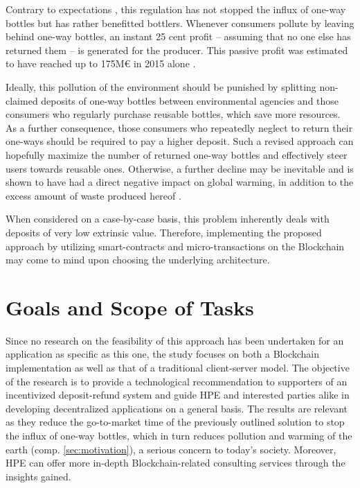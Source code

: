 Contrary to expectations \cite[§ 8]{verpackV}, this regulation has not stopped the influx of one-way bottles but has rather benefitted bottlers. Whenever consumers pollute by leaving behind one-way bottles, an instant 25 cent profit -- assuming that no one else has returned them -- is generated for the producer. This passive profit was estimated to have reached up to 175M\euro{} in 2015 alone \cite{mehrwegSystem}. 


Ideally, this pollution of the environment should be punished by splitting non-claimed deposits of one-way bottles between environmental agencies and those consumers who regularly purchase reusable bottles, which save more resources. As a further consequence, those consumers who repeatedly neglect to return their one-ways should be required to pay a higher deposit. Such a revised approach can hopefully maximize the number of returned one-way bottles and effectively steer users towards reusable ones. Otherwise, a further decline may be inevitable and is shown to have had a direct negative impact on global warming, in addition to the excess amount of waste produced hereof \cite{einwegUmweltbelastung}.

When considered on a case-by-case basis, this problem inherently deals with deposits of very low extrinsic value. Therefore, implementing the proposed approach by utilizing smart-contracts and micro-transactions on the Blockchain may come to mind upon choosing the underlying architecture.


\section{Goals and Scope of Tasks}
Since no research on the feasibility of this approach has been undertaken for an application as specific as this one, the study focuses on both a Blockchain implementation as well as that of a traditional client-server model. The objective of the research is to provide a technological recommendation to supporters of an incentivized deposit-refund system and guide \ac{HPE} and interested parties alike in developing decentralized applications on a general basis. The results are relevant as they reduce the go-to-market time of the previously outlined solution to stop the influx of one-way bottles, which in turn reduces pollution and warming of the earth (comp. \ref{sec:motivation}), a serious concern to today's society. Moreover, \ac{HPE} can offer more in-depth Blockchain-related consulting services through the insights gained.


